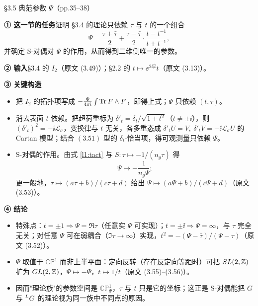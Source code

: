 \begin{kcard}{§3.5 典范参数 $\Psi$（pp.35--38）}

\noindent\textbf{① 这一节的任务}\quad 证明 \S3.4 的理论只依赖 $\tau$ 与 $t$ 的一个组合
\begin{equation}\label{l1:psi}\tag{3.50}
\Psi=\frac{\tau+\bar\tau}{2}+\frac{\tau-\bar\tau}{2}\cdot\frac{t-t^{-1}}{t+t^{-1}} ,
\end{equation}
并确定 S-对偶对 $\Psi$ 的作用，从而得到二维侧唯一的参数。\pA{}

\noindent\textbf{② 输入}\quad \S3.4 的 $I_2$（原文 (3.49)）；\S2.2 的 $t\mapsto\ee^{2\ii\hat\varphi}t$（原文 (3.13)）。

\noindent\textbf{③ 关键构造}\quad
\begin{itemize}
\item 把 $I_2$ 的拓扑项写成 $-\frac{\Psi}{4\pi\mathrm{i}}\int\operatorname{Tr} F\wedge F$，即得上式；$\Psi$ 只依赖 $(t,\tau)$。\pA{}
\item 消去表面 $t$ 依赖。把超荷重标为 $\delta'_t=\delta_t/\sqrt{1+t^2}$（$t\ne\pm\ii$），则 $(\delta'_t)^2=-\ii\mathcal L_\sigma$，变换律与 $t$ 无关，各多重态成 $\delta'_tU=V,\ \delta'_tV=-\ii\mathcal L_\sigma U$ 的 Cartan 模型；结合 $(3.51)$ 型的 $\delta_t$-恰当项，得可观测量只依赖 $\Psi$。\pA{}
\item S-对偶的作用。由式 \eqref{l1:tact} 与 $S:\tau\mapsto-1/(n_g\tau)$ 得
\begin{equation}\label{l1:spsi}\tag{3.54}
\Psi\longmapsto-\frac{1}{n_g\Psi} ;
\end{equation}
更一般地，$\tau\mapsto(a\tau+b)/(c\tau+d)$ 给出 $\Psi\mapsto(a\Psi+b)/(c\Psi+d)$（原文 (3.53)）。\pA{}
\end{itemize}

\noindent\textbf{④ 结论}\quad
\begin{itemize}
\item 特殊点：$t=\pm1\Rightarrow\Psi=\Re\tau$（任意实 $\Psi$ 可实现）；$t=\pm\ii\Rightarrow\Psi=\infty$，与 $\tau$ 完全无关；对任意 $\Psi$ 可在弱耦合（$\Im\tau\to\infty$）实现，$t^2=-(\Psi-\bar\tau)/(\Psi-\tau)$（原文 (3.52)）。\pA{}
\item $\Psi$ 取值于 $\mathbb{CP}^1$ 而非上半平面：定向反转（存在反定向等距时）可把 $SL(2,\mathbb{Z})$ 扩为 $GL(2,\mathbb{Z})$，$\Psi\mapsto-\Psi$，$t\mapsto1/t$（原文 (3.55)--(3.56)）。\pA{}
\item 因而"理论族"的参数空间是 $\mathbb{CP}^1_\Psi$，$\tau$ 与 $t$ 只是它的坐标；这正是 S-对偶能把 $G$ 与 ${}^{L}G$ 的理论视为同一族中不同点的原因。\pA{}
\end{itemize}


\end{kcard}
